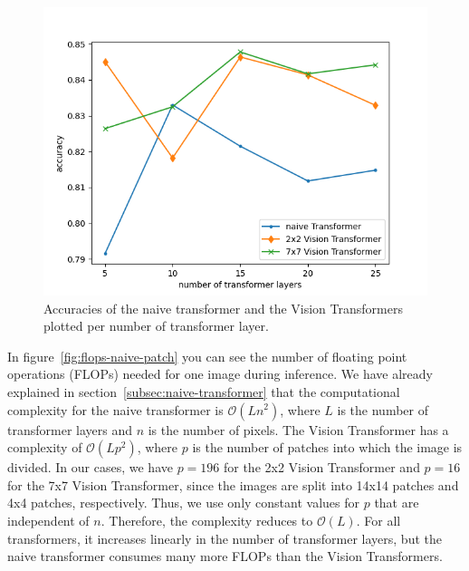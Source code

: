 \documentclass[a4paper]{scrartcl}
\begin{document}
    \begin{figure}[btp]
        \centering
        \includegraphics[width=0.8\linewidth]{img/plots/accuracies}
        \caption[Accuracies of the naive transformer and the Vision Transformer]{Accuracies of the naive transformer and the Vision Transformers plotted per number of transformer layer.}
        \label{fig:accuracies-naive-patch}
    \end{figure}

    In figure~\ref{fig:flops-naive-patch} you can see the number of floating point operations (FLOPs) needed for one image during inference.
    We have already explained in section~\ref{subsec:naive-transformer} that the computational complexity for the naive transformer is $\mathcal{O}(Ln^2)$, where $L$ is the number of transformer layers and $n$ is the number of pixels.
    The Vision Transformer has a complexity of $\mathcal{O}(Lp^2)$, where $p$ is the number of patches into which the image is divided.
    In our cases, we have $p = 196$ for the 2x2 Vision Transformer and $p = 16$ for the 7x7 Vision Transformer, since the images are split into 14x14 patches and 4x4 patches, respectively.
    Thus, we use only constant values for $p$ that are independent of $n$.
    Therefore, the complexity reduces to $\mathcal{O}(L)$.
    For all transformers, it increases linearly in the number of transformer layers, but the naive transformer consumes many more FLOPs than the Vision Transformers.
\end{document}

